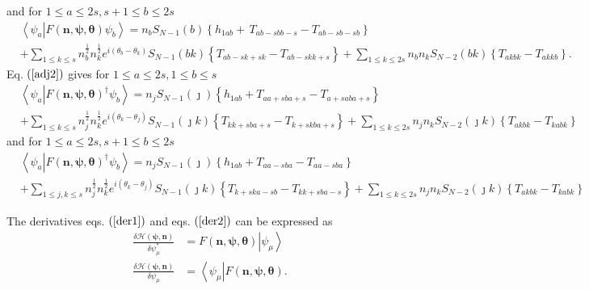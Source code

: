 \documentclass[aps,preprint]{revtex4}%
\begin{document}
and for $1\leq a\leq2s,s+1\leq b\leq2s$%
\begin{align}
&  \left\langle \psi_{a}\left\vert F\left(  \mathbf{n},\mathbf{\psi
},\mathbf{\theta}\right)  \psi_{b}\right.  \right\rangle =n_{b}S_{N-1}\left(
b\right)  \left\{  h_{1ab}+\,T_{ab-sbb-s}-T_{ab-sb-sb}\right\} \nonumber\\
&  +\sum_{1\leq k\leq s}n_{b}^{\frac{1}{2}}n_{k}^{\frac{1}{2}}e^{i\left(
\theta_{b}-\theta_{k}\right)  }S_{N-1}\left(  bk\right)  \left\{
T_{ab-sk+sk}-T_{ab-skk+s}\right\}  +\sum_{1\leq k\leq2s}n_{b}n_{k}%
S_{N-2}\left(  bk\right)  \overset{}{\left\{  T_{akbk}-T_{akkb}\right\}  }.
\end{align}
Eq. $\left(  \ref{adj2}\right)  $ gives for $1\leq a\leq2s,1\leq b\leq s$%
\begin{align}
&  \left\langle \psi_{a}\left\vert F\left(  \mathbf{n},\mathbf{\psi
},\mathbf{\theta}\right)  ^{\dagger}\psi_{b}\right.  \right\rangle
=n_{j}S_{N-1}\left(  \jmath\right)  \left\{  h_{1ab}+T_{aa+sba+s}%
-T_{a+saba+s}\right\} \nonumber\\
&  +\sum_{1\leq k\leq s}n_{j}^{\frac{1}{2}}n_{k}^{\frac{1}{2}}e^{i\left(
\theta_{k}-\theta_{j}\right)  }S_{N-1}\left(  \jmath k\right)  \left\{
T_{kk+sba+s}-T_{k+skba+s}\right\}  +\sum_{1\leq k\leq2s}n_{j}n_{k}%
S_{N-2}\left(  \jmath k\right)  \left\{  T_{akbk}-T_{kabk}\right\}
\end{align}
and for $1\leq a\leq2s,s+1\leq b\leq2s$%
\begin{align}
&  \left\langle \psi_{a}\left\vert F\left(  \mathbf{n},\mathbf{\psi
},\mathbf{\theta}\right)  ^{\dagger}\psi_{b}\right.  \right\rangle
=n_{j}S_{N-1}\left(  \jmath\right)  \left\{  h_{1ab}+T_{aa-sba}-T_{aa-sba}%
\right\} \nonumber\\
&  +\sum_{1\leq j,k\leq s}n_{j}^{\frac{1}{2}}n_{k}^{\frac{1}{2}}e^{i\left(
\theta_{k}-\theta_{j}\right)  }S_{N-1}\left(  \jmath k\right)  \left\{
T_{k+ska-sb}-T_{kk+sba-s}\right\}  +\sum_{1\leq k\leq2s}n_{j}n_{k}%
S_{N-2}\left(  \jmath k\right)  \left\{  T_{akbk}-T_{kabk}\right\}
\end{align}


The derivatives eqs. $\left(  \ref{der1}\right)  $ and eqs. $\left(
\ref{der2}\right)  $ can be expressed as
\begin{align}
\frac{\delta\mathcal{H}\left(  \mathbf{\psi,n}\right)  }{\delta\psi_{\mu
}^{\ast}}  &  =F\left(  \mathbf{n},\mathbf{\psi},\mathbf{\theta}\right)
\left\vert \psi_{\mu}\right\rangle \\
\frac{\delta\mathcal{H}\left(  \mathbf{\psi,n}\right)  }{\delta\psi_{\mu}}  &
=\left\langle \psi_{\mu}\right\vert F\left(  \mathbf{n},\mathbf{\psi
},\mathbf{\theta}\right)  .
\end{align}
\end{document}
